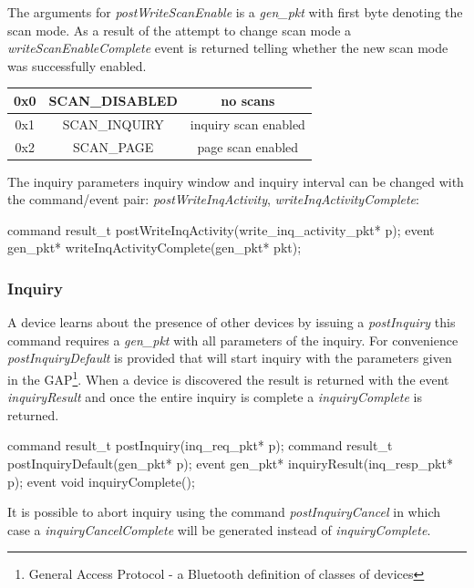 \documentclass[a4paper,10pt]{article}
\begin{document}
The arguments for \emph{postWriteScanEnable} is a \emph{gen\_pkt} with
first byte denoting the scan mode. As a result of the attempt to
change scan mode a \emph{writeScanEnableComplete} event is returned
telling whether the new scan mode was successfully enabled.

\begin{center}
\begin{tabular}{|c|c|c|}
\hline
0x0 & SCAN\_DISABLED & no scans\\
\hline
0x1 & SCAN\_INQUIRY  & inquiry scan enabled\\
\hline
0x2 & SCAN\_PAGE     & page scan enabled\\
\hline
\end{tabular}
\end{center}

The inquiry parameters inquiry window and inquiry interval\cite{BT02}
can be changed with the command/event pair: \emph{postWriteInqActivity},
\emph{writeInqActivityComplete}:

\begin{boxedverbatim}
command result_t postWriteInqActivity(write_inq_activity_pkt* p);
event gen_pkt* writeInqActivityComplete(gen_pkt* pkt);
\end{boxedverbatim}

\subsubsection{Inquiry}
A device learns about the presence of other devices by issuing a
\emph{postInquiry} this command requires a \emph{gen\_pkt} with all
parameters of the inquiry. For convenience \emph{postInquiryDefault}
is provided that will start inquiry with the parameters given in the
GAP\footnote{General Access Protocol - a Bluetooth definition of
  classes of devices}. When a device is discovered the result is
returned with the event \emph{inquiryResult} and once the entire
inquiry is complete a \emph{inquiryComplete} is returned.

\begin{boxedverbatim}
command result_t postInquiry(inq_req_pkt* p);
command result_t postInquiryDefault(gen_pkt* p);
event gen_pkt* inquiryResult(inq_resp_pkt* p);
event void inquiryComplete();
\end{boxedverbatim}

It is possible to abort inquiry using the command
\emph{postInquiryCancel} in which case a \emph{inquiryCancelComplete}
will be generated instead of \emph{inquiryComplete}.
\end{document}

